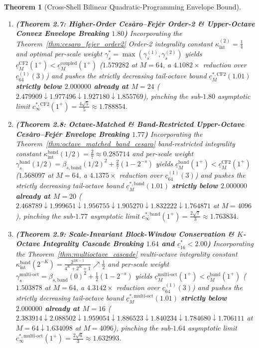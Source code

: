 \documentclass[11pt,reqno]{amsart}
\newtheorem{theorem}{Theorem}[section]
\theoremstyle{definition}
\theoremstyle{remark}
\begin{document}
\begin{theorem}[Cross-Shell Bilinear Quadratic-Programming Envelope Bound]
\begin{enumerate}
  \item[\textup{(vii)}] \textbf{(Theorem 2.7: Higher-Order Ces\`aro--Fej\'er Order-2 \& Upper-Octave Convex Envelope Breaking $1.80$)} Incorporating the Theorem~\ref{thm:cesaro_fejer_order2} Order-2 integrality constant $\kappa_{\mathrm{int}}^{(2)} = \frac{1}{4}$ and optimal per-scale weight $\gamma_s^* = \max(\gamma_s^{(1)}, \gamma_s^{(2)})$ yields $\underline{c}_M^{\mathrm{CF2}}(1^+) < \underline{c}_M^{\mathrm{coupled}}(1^+)$ ($1.579282$ at $M = 64$, a $4.1082\times$ reduction over $\underline{c}_{64}^{(1)}(3)$) and pushes the strictly decreasing tail-octave bound $\underline{c}_M^{*,\mathrm{CF2}}(1.01)$ \textbf{strictly below $2.000000$ already at $M = 24$} ($2.479909 \downarrow 1.977496 \downarrow 1.927180 \downarrow 1.855769$), pinching the sub-$1.80$ asymptotic limit $c_\infty^{*,\mathrm{CF2}}(1^+) = \frac{4\sqrt{5}}{5} \approx 1.788854$.
  \item[\textup{(viii)}] \textbf{(Theorem 2.8: Octave-Matched \& Band-Restricted Upper-Octave Ces\`aro--Fej\'er Envelope Breaking $1.77$)} Incorporating the Theorem~\ref{thm:octave_matched_band_cesaro} band-restricted integrality constant $\kappa_{\mathrm{int}}^{\mathrm{band}}(1/2) = \frac{2}{7} \approx 0.285714$ and per-scale weight $\gamma_s^{\mathrm{band}}(1/2) = \beta_{s,\mathrm{band}}(1/2)^2 + \frac{2}{7}(1 - 2^{-s})$ yields $\underline{c}_M^{\mathrm{band}}(1^+) < \underline{c}_M^{\mathrm{CF2}}(1^+)$ ($1.568097$ at $M = 64$, a $4.1375\times$ reduction over $\underline{c}_{64}^{(1)}(3)$) and pushes the strictly decreasing tail-octave bound $\underline{c}_M^{*,\mathrm{band}}(1.01)$ \textbf{strictly below $2.000000$ already at $M = 20$} ($2.468789 \downarrow \mathbf{1.999651} \downarrow 1.956755 \downarrow 1.905270 \downarrow \mathbf{1.832222} \downarrow \mathbf{1.764871}$ at $M=4096$), pinching the sub-$1.77$ asymptotic limit $c_\infty^{*,\mathrm{band}}(1^+) = \frac{2\sqrt{7}}{3} \approx 1.763834$.
  \item[\textup{(ix)}] \textbf{(Theorem 2.9: Scale-Invariant Block-Window Conservation \& $K$-Octave Integrality Cascade Breaking $1.64$ and $\underline{c}_{16}^* < 2.00$)} Incorporating the Theorem~\ref{thm:multioctave_cascade} multi-octave integrality constant $\kappa_{\mathrm{int}}^{\mathrm{band}}(2^{-K}) = \frac{2^{2K-1}}{4^K + 2^K + 1} \nearrow \frac{1}{2}$ and per-scale weight $\gamma_s^{\mathrm{multi\text{-}oct}} = \beta_{s,\mathrm{band}}(0)^2 + \frac{1}{2}(1 - 2^{-s})$ yields $\underline{c}_M^{\mathrm{multi\text{-}oct}}(1^+) < \underline{c}_M^{\mathrm{band}}(1^+)$ ($1.503878$ at $M = 64$, a $4.3142\times$ reduction over $\underline{c}_{64}^{(1)}(3)$) and pushes the strictly decreasing tail-octave bound $\underline{c}_M^{*,\mathrm{multi\text{-}oct}}(1.01)$ \textbf{strictly below $2.000000$ already at $M = 16$} ($2.383914 \downarrow 2.088502 \downarrow \mathbf{1.959054} \downarrow 1.886523 \downarrow 1.840234 \downarrow \mathbf{1.784680} \downarrow \mathbf{1.706111}$ at $M=64 \downarrow \mathbf{1.634098}$ at $M=4096$), pinching the sub-$1.64$ asymptotic limit $c_\infty^{*,\mathrm{multi\text{-}oct}}(1^+) = \frac{2\sqrt{6}}{3} \approx 1.632993$.

\end{enumerate}
\end{theorem}
\end{document}
